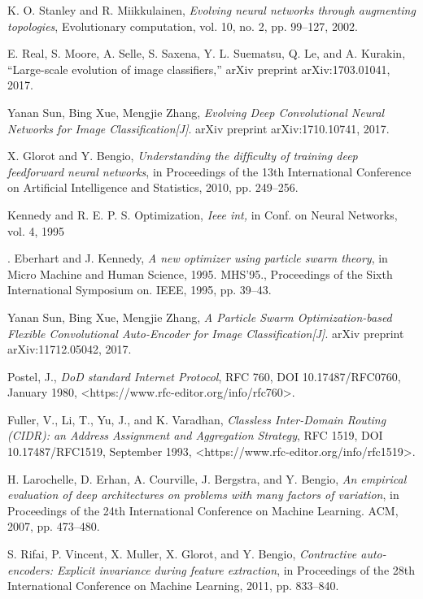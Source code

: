 \documentclass[conference]{IEEEtran}
\begin{document}
\begin{thebibliography}{}
K. O. Stanley and R. Miikkulainen, \emph{Evolving neural networks through augmenting topologies}, Evolutionary computation, vol. 10, no. 2, pp. 99–127, 2002.

E. Real, S. Moore, A. Selle, S. Saxena, Y. L. Suematsu, Q. Le, and A. Kurakin, “Large-scale evolution of image classiﬁers,” arXiv preprint arXiv:1703.01041, 2017. 

Yanan Sun, Bing Xue, Mengjie Zhang, \emph{Evolving Deep Convolutional Neural Networks for Image Classification[J]}. arXiv preprint arXiv:1710.10741, 2017. 

X. Glorot and Y. Bengio, \emph{Understanding the difﬁculty of training deep feedforward neural networks}, in Proceedings of the 13th International Conference on Artiﬁcial Intelligence and Statistics, 2010, pp. 249–256. 

Kennedy and R. E. P. S. Optimization, \emph{Ieee int,} in Conf. on Neural Networks, vol. 4, 1995

. Eberhart and J. Kennedy, \emph{A new optimizer using particle swarm theory}, in Micro Machine and Human Science, 1995. MHS’95., Proceedings of the Sixth International Symposium on.  IEEE, 1995, pp. 39–43.

Yanan Sun, Bing Xue, Mengjie Zhang, \emph{A Particle Swarm Optimization-based Flexible Convolutional Auto-Encoder for Image Classification[J]}. arXiv preprint arXiv:11712.05042, 2017. 

Postel, J., \emph{DoD standard Internet Protocol}, RFC 760, DOI 10.17487/RFC0760, January 1980, <https://www.rfc-editor.org/info/rfc760>.

Fuller, V., Li, T., Yu, J., and K. Varadhan, \emph{Classless Inter-Domain Routing (CIDR): an Address Assignment and Aggregation Strategy}, RFC 1519, DOI 10.17487/RFC1519, September 1993, <https://www.rfc-editor.org/info/rfc1519>.

H. Larochelle, D. Erhan, A. Courville, J. Bergstra, and Y. Bengio, \emph{An empirical evaluation of deep architectures on problems with many factors of variation}, in Proceedings of the 24th International Conference on Machine Learning. ACM, 2007, pp. 473–480.

S. Rifai, P. Vincent, X. Muller, X. Glorot, and Y. Bengio, \emph{Contractive auto-encoders: Explicit invariance during feature extraction}, in Proceedings of the 28th International Conference on Machine Learning, 2011, pp. 833–840. 


\end{thebibliography}
\end{document}
